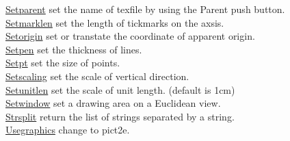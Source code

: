\documentclass[papersize,a4paper,12pt]{article}
\begin{document}
\begin{tabbing}
\hyperlink{setparent}{Setparent} \> set the name of texfile by using the Parent push button.\\
\hyperlink{setmarklen}{Setmarklen} \> set the length of tickmarks on the axsis.\\
\hyperlink{setorigin}{Setorigin} \> set or transtate the coordinate of apparent origin.\\
\hyperlink{setpen}{Setpen} \> set the thickness of lines.\\
\hyperlink{setpt}{Setpt} \> set the size of points.\\
\hyperlink{setscaling}{Setscaling} \> set the scale of vertical direction.\\
\hyperlink{setunitlen}{Setunitlen} \> set the scale of unit length. (default is 1cm)\\
\hyperlink{setwindow}{Setwindow} \> set a drawing area on a Euclidean view.\\
\hyperlink{strsplit}{Strsplit} \> return the list of strings separated by a string.\\
\hyperlink{usegraphics}{Usegraphics} \> change to pict2e.\\


\end{tabbing}
\end{document}
